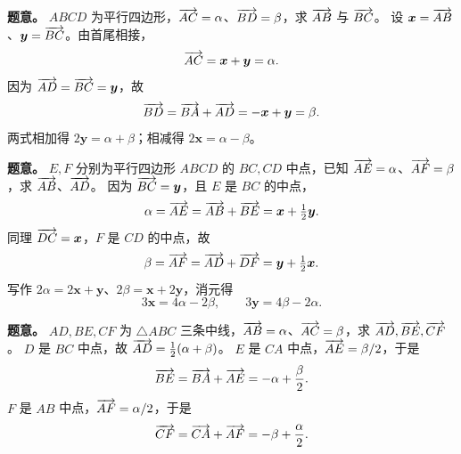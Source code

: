 \textbf{题意。} $ABCD$ 为平行四边形，$\overrightarrow{AC}=\alpha$、$\overrightarrow{BD}=\beta$，求 $\overrightarrow{AB}$ 与 $\overrightarrow{BC}$。
设 $\bm x=\overrightarrow{AB}$、$\bm y=\overrightarrow{BC}$。由首尾相接，
\[
\overrightarrow{AC}=\bm x+\bm y=\alpha.
\]
因为 $\overrightarrow{AD}=\overrightarrow{BC}=\bm y$，故
\[
\overrightarrow{BD}=\overrightarrow{BA}+\overrightarrow{AD}=-\bm x+\bm y=\beta.
\]
两式相加得 $2\bm y=\alpha+\beta$；相减得 $2\bm x=\alpha-\beta$。

\textbf{题意。} $E,F$ 分别为平行四边形 $ABCD$ 的 $BC,CD$ 中点，已知 $\overrightarrow{AE}=\alpha$、$\overrightarrow{AF}=\beta$，求 $\overrightarrow{AB}$、$\overrightarrow{AD}$。
因为 $\overrightarrow{BC}=\bm y$，且 $E$ 是 $BC$ 的中点，
\[
\alpha=\overrightarrow{AE}=\overrightarrow{AB}+\overrightarrow{BE}=\bm x+\tfrac12\bm y.
\]
同理 $\overrightarrow{DC}=\bm x$，$F$ 是 $CD$ 的中点，故
\[
\beta=\overrightarrow{AF}=\overrightarrow{AD}+\overrightarrow{DF}=\bm y+\tfrac12\bm x.
\]
写作 $2\alpha=2\bm x+\bm y$、$2\beta=\bm x+2\bm y$，消元得
\[
3\bm x=4\alpha-2\beta,\qquad3\bm y=4\beta-2\alpha.
\]

\textbf{题意。} $AD,BE,CF$ 为 $\triangle ABC$ 三条中线，$\overrightarrow{AB}=\alpha$、$\overrightarrow{AC}=\beta$，求 $\overrightarrow{AD},\overrightarrow{BE},\overrightarrow{CF}$。
$D$ 是 $BC$ 中点，故 $\overrightarrow{AD}=\frac12(\alpha+\beta)$。
$E$ 是 $CA$ 中点，$\overrightarrow{AE}=\beta/2$，于是
\[
\overrightarrow{BE}=\overrightarrow{BA}+\overrightarrow{AE}=-\alpha+\frac{\beta}{2}.
\]
$F$ 是 $AB$ 中点，$\overrightarrow{AF}=\alpha/2$，于是
\[
\overrightarrow{CF}=\overrightarrow{CA}+\overrightarrow{AF}=-\beta+\frac{\alpha}{2}.
\]


